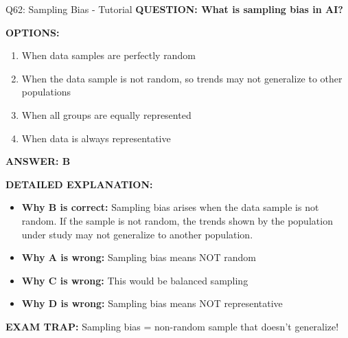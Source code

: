 \documentclass[8pt]{beamer}
\begin{document}
	\begin{frame}{Q62: Sampling Bias - Tutorial}
		\fontsize{6.5}{7.5}\selectfont
		\textbf{QUESTION: What is sampling bias in AI?}
		
		\vspace{0.1cm}
		\textbf{OPTIONS:}
		\begin{enumerate}
			\item When data samples are perfectly random
			\item When the data sample is not random, so trends may not generalize to other populations
			\item When all groups are equally represented
			\item When data is always representative
		\end{enumerate}
		
		\vspace{0.1cm}
		\textcolor{myblue}{\textbf{ANSWER: B}}
		
		\vspace{0.1cm}
		\textbf{DETAILED EXPLANATION:}
		\begin{itemize}
			\item \textbf{Why B is correct:} Sampling bias arises when the data sample is not random. If the sample is not random, the trends shown by the population under study may not generalize to another population.
			\item \textbf{Why A is wrong:} Sampling bias means NOT random
			\item \textbf{Why C is wrong:} This would be balanced sampling
			\item \textbf{Why D is wrong:} Sampling bias means NOT representative
		\end{itemize}
		
		\textcolor{myred}{\textbf{EXAM TRAP:}} Sampling bias = \textcolor{myblue}{non-random sample that doesn't generalize}!
	\end{frame}
	
\end{document}
